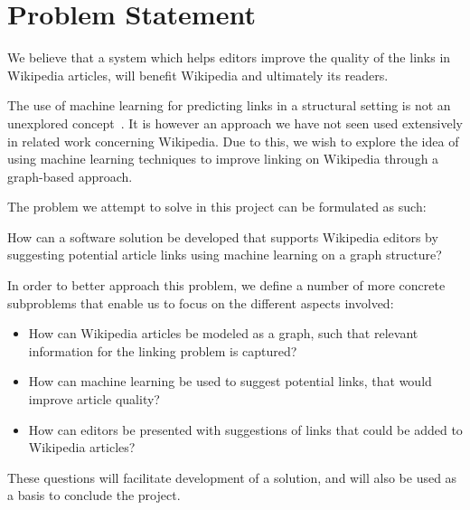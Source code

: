 \section{Problem Statement}\label{sec:problem_statement}
We believe that a system which helps editors improve the quality of the links in Wikipedia articles, will benefit Wikipedia and ultimately its readers.

The use of machine learning for predicting links in a structural setting is not an unexplored concept~\cite{tang2015line,al2006link}. It is however an approach we have not seen used extensively in related work concerning Wikipedia. Due to this, we wish to explore the idea of using machine learning techniques to improve linking on Wikipedia through a graph-based approach.

The problem we attempt to solve in this project can be formulated as such:
\newcommand{\problemstatement}{\vspace{1ex} %
\begin{formal}
How can a software solution be developed that supports Wikipedia editors by suggesting potential article links using machine learning on a graph structure?
\end{formal}}

\problemstatement

In order to better approach this problem, we define a number of more concrete subproblems that enable us to focus on the different aspects involved:

\newcommand{\subproblemone}{How can Wikipedia articles be modeled as a graph, such that relevant information for the linking problem is captured?}
\newcommand{\subproblemtwo}{How can machine learning be used to suggest potential links, that would improve article quality?}
\newcommand{\subproblemthree}{How can editors be presented with suggestions of links that could be added to Wikipedia articles?}

\newcommand{\subproblems}{
\begin{itemize}
  \item \subproblemone
  \item \subproblemtwo
  \item \subproblemthree
\end{itemize}}

\subproblems

These questions will facilitate development of a solution, and will also be used as a basis to conclude the project.

